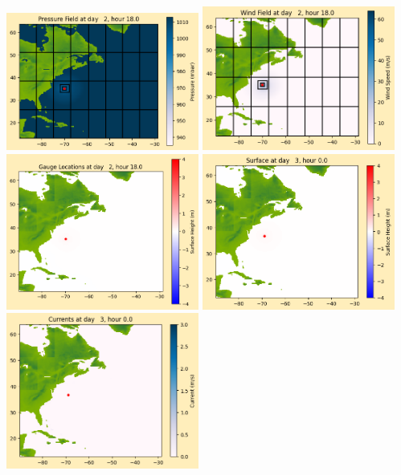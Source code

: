 \documentclass[11pt]{article}
\begin{document}
\includegraphics[width=0.475\textwidth]{frame0023fig1012.png}
\vskip 10pt 
\includegraphics[width=0.475\textwidth]{frame0023fig1013.png}
\includegraphics[width=0.475\textwidth]{frame0023fig1014.png}
\vskip 10pt 
\includegraphics[width=0.475\textwidth]{frame0024fig1001.png}
\includegraphics[width=0.475\textwidth]{frame0024fig1002.png}
\end{document}

